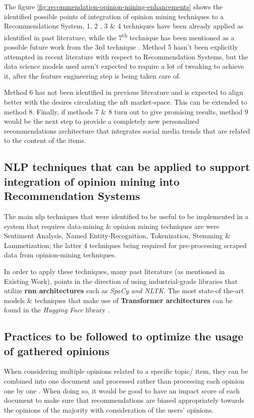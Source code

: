 The figure \ref{fig:recommendation-opinion-mining-enhancements} shows the identified possible points of integration of opinion mining techniques to a Recommendations System.
1, 2 \autocite{linden_amazoncom_2003, larry_history_2019}, 3 \autocite{cheng_hybrid_2020} \& 4 \autocite{ayushi_cross-domain_2018} techniques have been already applied as identified in past literature, while the 7\textsuperscript{th} technique has been mentioned as a possible future work from the 3rd technique \autocite{chen_user_2019}. Method 5 hasn't been explicitly attempted in recent literature with respect to Recommendation Systems, but the data science models used aren't expected to require a lot of tweaking to achieve it, after the feature engineering step is being taken care of.

Method 6 has not been identified in previous literature and is expected to align better with the desires circulating the \gls{nft} market-space. This can be extended to method 8. Finally, if methods 7 \& 8 turn out to give promising results, method 9 would be the next step to provide a completely new personalized recommendations architecture that integrates social media trends that are related to the content of the items.

\subsection{NLP techniques that can be applied to support integration of opinion mining into Recommendation Systems}

The main \gls{nlp} techniques that were identified to be useful to be implemented in a system that requires data-mining \& opinion mining techniques are were Sentiment Analysis, Named Entity-Recognition, Tokenization, Stemming \& Lammetization; the latter 4 techniques being required for pre-processing scraped data from opinion-mining techniques.

In order to apply these techniques, many past literature (as mentioned in Existing Work), points in the direction of using industrial-grade libraries that utilize \textbf{\gls{rnn} architectures} such as \textit{SpaCy and NLTK}. The most state-of the-art models \& techniques that make use of \textbf{Transformer architectures} can be found in the \textit{Hugging Face} library \autocite{wolf_transformers_2020}.

\subsection{Practices to be followed to optimize the usage of gathered opinions}
When considering multiple opinions related to a specific topic/ item, they can be combined into one document and processed rather than processing each opinion one by one \autocite{nah_opinion_2018}. When doing so, it would be good to have an impact score of each document to make sure that recommendations are biased appropriately towards the opinions of the majority with consideration of the users' opinions.



